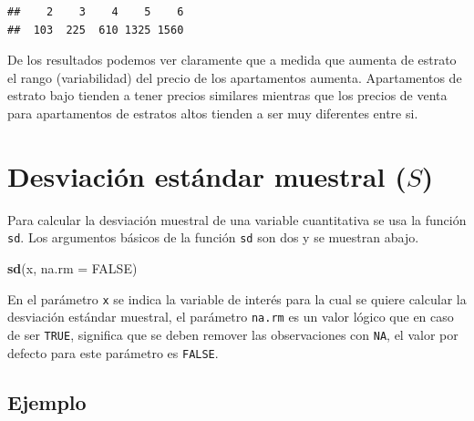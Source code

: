 \documentclass[10pt,]{krantz}
\makeatletter
\newenvironment{Shaded}{\begin{snugshade}}{\end{snugshade}}
\newcommand{\KeywordTok}[1]{\textcolor[rgb]{0.13,0.29,0.53}{\textbf{{#1}}}}
\newcommand{\DataTypeTok}[1]{\textcolor[rgb]{0.13,0.29,0.53}{{#1}}}
\newcommand{\StringTok}[1]{\textcolor[rgb]{0.31,0.60,0.02}{{#1}}}
\newcommand{\OtherTok}[1]{\textcolor[rgb]{0.56,0.35,0.01}{{#1}}}
\newcommand{\NormalTok}[1]{{#1}}
\newenvironment{kframe}{%
\medskip{}
\setlength{\fboxsep}{.8em}
 \def\at@end@of@kframe{}%
 \ifinner\ifhmode%
  \def\at@end@of@kframe{\end{minipage}}%
  \begin{minipage}{\columnwidth}%
 \fi\fi%
 \def\FrameCommand##1{\hskip\@totalleftmargin \hskip-\fboxsep
 \colorbox{shadecolor}{##1}\hskip-\fboxsep
     \hskip-\linewidth \hskip-\@totalleftmargin \hskip\columnwidth}%
 \MakeFramed {\advance\hsize-\width
   \@totalleftmargin\z@ \linewidth\hsize
   \@setminipage}}%
 {\par\unskip\endMakeFramed%
 \at@end@of@kframe}
\renewenvironment{Shaded}{\begin{kframe}}{\end{kframe}}
\makeatother
\begin{document}
\begin{Shaded}
\end{Shaded}

\begin{verbatim}
##    2    3    4    5    6 
##  103  225  610 1325 1560
\end{verbatim}

De los resultados podemos ver claramente que a medida que aumenta de
estrato el rango (variabilidad) del precio de los apartamentos aumenta.
Apartamentos de estrato bajo tienden a tener precios similares mientras
que los precios de venta para apartamentos de estratos altos tienden a
ser muy diferentes entre si.

\section{\texorpdfstring{Desviación estándar muestral (\(S\))
}{Desviación estándar muestral (S)  }}\label{desviacion-estandar-muestral-s}

Para calcular la desviación muestral de una variable cuantitativa se usa
la función \texttt{sd}. Los argumentos básicos de la función \texttt{sd}
son dos y se muestran abajo.

\begin{Shaded}
\begin{Highlighting}[]
\KeywordTok{sd}\NormalTok{(x, }\DataTypeTok{na.rm =} \OtherTok{FALSE}\NormalTok{)}
\end{Highlighting}
\end{Shaded}

En el parámetro \texttt{x} se indica la variable de interés para la cual
se quiere calcular la desviación estándar muestral, el parámetro
\texttt{na.rm} es un valor lógico que en caso de ser \texttt{TRUE},
significa que se deben remover las observaciones con \texttt{NA}, el
valor por defecto para este parámetro es \texttt{FALSE}.

\subsection*{Ejemplo}\label{ejemplo-37}
\end{document}
